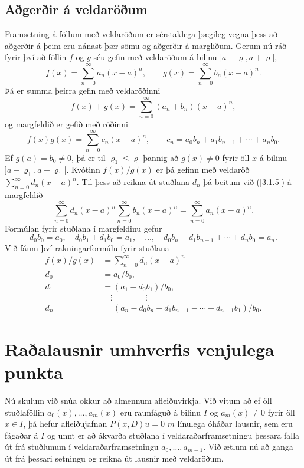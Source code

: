 \subsection*{Aðgerðir á veldaröðum}

Framsetning á
föllum með veldaröðum er sérstaklega þægileg vegna þess að aðgerðir á
þeim eru nánast þær sömu og aðgerðir á margliðum.  Gerum nú ráð fyrir
því að föllin $f$ og $g$ séu gefin með veldaröðum á bilinu
$]a-{\varrho},a+{\varrho}[$,
$$
f(x)=\sum\limits_{n=0}^{\infty} a_n(x-a)^n,\qquad
g(x)=\sum\limits_{n=0}^{\infty} b_n(x-a)^n.
$$
Þá er summa þeirra gefin með veldaröðinni
\begin{equation*}
f(x)+g(x)=\sum\limits_{n=0}^{\infty} (a_n+b_n)(x-a)^n,\label{3.1.4}
\end{equation*}
og margfeldið er gefið með röðinni
\begin{equation*}
f(x)g(x)=\sum\limits_{n=0}^{\infty} c_n(x-a)^n, 
\qquad
c_n=a_0b_n+a_1b_{n-1}+\cdots+a_nb_0.\label{3.1.5}
\end{equation*}
Ef $g(a)=b_0\neq 0$, þá er til ${\varrho}_1\leq {\varrho}$
þannig að $g(x)\neq 0$ fyrir öll $x$ á bilinu
$]a-{\varrho}_1,a+{\varrho}_1[$.
Kvótinn $f(x)/g(x)$ er þá gefinn með veldaröð
$\sum\limits_{n=0}^{\infty} d_n(x-a)^n$.  Til þess að reikna út stuðlana
$d_n$ þá beitum við (\ref{3.1.5}) á margfeldið
$$
\sum\limits_{n=0}^{\infty} d_n(x-a)^n
\sum\limits_{n=0}^{\infty} b_n(x-a)^n
=\sum\limits_{n=0}^{\infty} a_n(x-a)^n.
$$
Formúlan fyrir stuðlana í margfeldinu gefur
$$
d_0b_0=a_0, \quad
d_0b_1+d_1b_0=a_1, \quad \dots, \quad 
d_0b_n+d_1b_{n-1}+\cdots+d_nb_0=a_n.
$$
Við fáum því rakningarformúlu fyrir stuðlana
\begin{align*}
f(x)/g(x)&=\sum\limits_{n=0}^{\infty} d_n(x-a)^n\label{3.1.6}\\
d_0&=a_0/b_0,\\
d_1&=(a_1-d_0b_1)/b_0,\\
&\quad \vdots\qquad\qquad \vdots\\
d_n&=(a_n-d_0b_n-d_1b_{n-1}-\cdots-d_{n-1}b_1)/b_0.
\end{align*}

 
\section{Raðalausnir umhverfis
venjulega punkta}

\noindent
Nú skulum við snúa okkur að almennum  afleiðuvirkja.
Við vitum    
að ef öll stuðlaföllin $a_0(x),\dots,a_{m}(x)$  eru
raunfáguð á bilinu $I$ og $a_m(x)\neq 0$ fyrir öll $x\in I$, 
þá hefur afleiðujafnan $P(x,D)u=0$
$m$ línulega óháðar lausnir, sem eru fágaðar á $I$ og
unnt er að ákvarða stuðlana í veldaraðarframsetningu þessara falla út
frá stuðlunum í veldaraðarframsetningu $a_0,\dots,a_{m-1}$.  
Við ætlum nú að ganga út frá þessari setningu og reikna út lausnir með 
veldaröðum.

